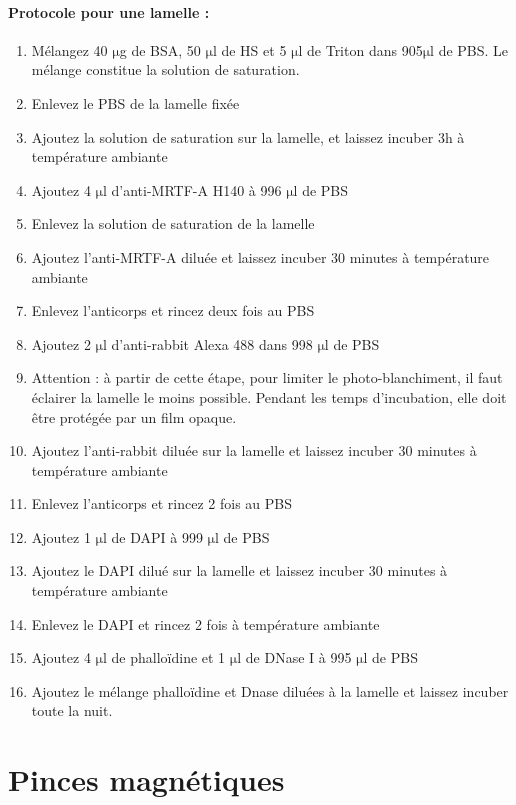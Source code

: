 \documentclass{report}
\newcommand{\micro}{$\mathrm{\mu}$}
\begin{document}
\paragraph{Protocole pour une lamelle : }
\begin{enumerate}
\item Mélangez 40 \micro g de BSA, 50 \micro l de HS et 5 \micro l de Triton dans 905\micro l de PBS. Le mélange constitue la solution de saturation.
\item Enlevez le PBS de la lamelle fixée
\item Ajoutez la solution de saturation sur la lamelle, et laissez incuber 3h à température ambiante
\item Ajoutez 4 \micro l d'anti-MRTF-A H140 à 996 \micro l de PBS
\item Enlevez la solution de saturation de la lamelle
\item Ajoutez l'anti-MRTF-A diluée et laissez incuber 30 minutes à température ambiante
\item Enlevez l'anticorps et rincez deux fois au PBS
\item Ajoutez 2 \micro l d'anti-rabbit Alexa 488 dans 998 \micro l de PBS
\item Attention : à partir de cette étape, pour limiter le photo-blanchiment, il faut éclairer la lamelle le moins possible. Pendant les temps d'incubation, elle doit être protégée par un film opaque. 
\item Ajoutez l'anti-rabbit diluée sur la lamelle et laissez incuber 30 minutes à température ambiante
\item Enlevez l'anticorps et rincez 2 fois au PBS
\item Ajoutez 1 \micro l de DAPI à 999 \micro l de PBS
\item Ajoutez le DAPI dilué sur la lamelle et laissez incuber 30 minutes à température ambiante
\item Enlevez le DAPI et rincez 2 fois à température ambiante
\item Ajoutez 4 \micro l de phalloïdine et 1 \micro l de DNase I à 995 \micro l de PBS
\item Ajoutez le mélange phalloïdine et Dnase diluées à la lamelle et laissez incuber toute la nuit.

\end{enumerate}

\section{Pinces magnétiques}
\end{document}
